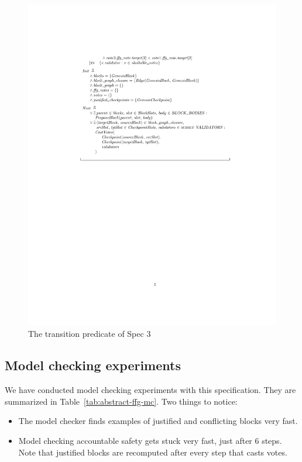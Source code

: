 \begin{figure}
    \centering
    \includegraphics[width=\textwidth]{images/abstract-ffg-next.pdf}  %
    \caption{The transition predicate of Spec 3}\label{fig:abstract-ffg-next}
\end{figure}

\subsection{Model checking experiments}

We have conducted model checking experiments with this specification. They are
summarized in Table~\ref{tab:abstract-ffg-mc}. Two things to notice:

\begin{itemize}

  \item The model checker finds examples of justified and conflicting blocks
    very fast.

  \item Model checking accountable safety gets stuck very fast, just after 6
    steps. Note that justified blocks are recomputed after every step that
    casts votes.

\end{itemize}

